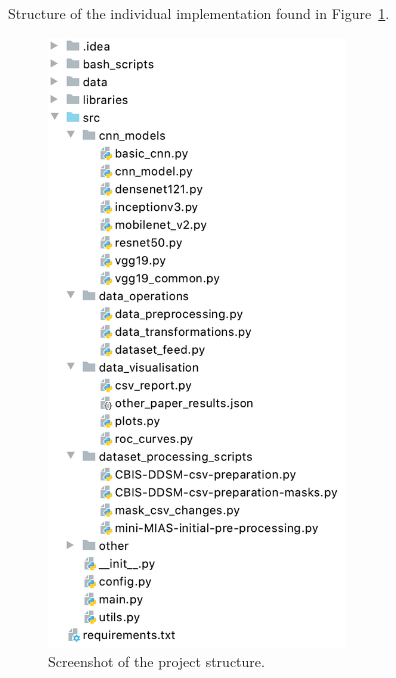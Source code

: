 Structure of the individual implementation  found in Figure~\ref{fig:appendix-project_structure}.

\begin{figure}[h]
\centerline{\includegraphics[width=0.70\textwidth]{figures/appendix/project_structure.png}}
\caption{\label{fig:appendix-project_structure}Screenshot of the project structure.}
\end{figure}